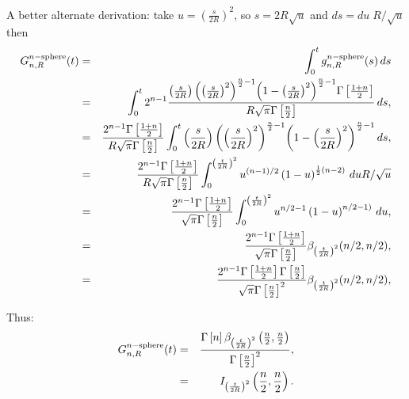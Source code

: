      
A better alternate derivation: take $u={\left(\frac{s}{2R}\right)}^2$, so $s = 2R \sqrt{u}$ and $ds = du\; R / \sqrt{u}$ then
\begin{eqnarray}
G^{n-{\rm sphere}}_{n,R}(t)
    & = & \int_0^t g^{n-{\rm sphere}}_{n,R}(s) \, ds \nonumber \\
    & = & \int_0^t  2^{n-1} \frac{\left( \frac{s}{2R}\right) {\left({\left( \frac{s}{2R}\right)}^{2}\right)}^{\frac{n}{2} -1}
             {\left(1 - {\left( \frac{s}{2R}\right)}^{2}  \right)}^{\frac{n}{2} -1}
             \Gamma\left[\frac{1+n}{2}\right]}{R\sqrt{\pi }
             \Gamma\left[\frac{n}{2}\right]} 
             \, ds, \nonumber \\    
    & = & \frac{ 2^{n- 1} \Gamma\left[\frac{1+n}{2}\right]}{R\sqrt{\pi}\Gamma\left[\frac{n}{2}\right]}
           \int_0^t \left( \frac{s}{2R}\right) {\left({\left( \frac{s}{2R}\right)}^{2}\right)}^{\frac{n}{2} -1}
             {\left(1 - {\left( \frac{s}{2R}\right)}^{2}  \right)}^{\frac{n}{2} -1}
             \, ds, \nonumber \\    
    & = & \frac{ 2^{n-1} \Gamma\left[\frac{1+n}{2}\right]}{R\sqrt{\pi}\Gamma\left[\frac{n}{2}\right]}
           \int_0^{ {\left(\frac{t}{2R}\right)}^{2} } u^{(n-1)/2}  \left(1 - u\right)^{\frac{1}{2} (n-2)}
             \, du R / \sqrt{u}  \nonumber \\    
    & = & \frac{ 2^{n-1} \Gamma\left[\frac{1+n}{2}\right]}{\sqrt{\pi}\Gamma\left[\frac{n}{2}\right]}
           \int_0^{{\left(\frac{t}{2R}\right)}^{2}} u^{n/2-1}  \left(1 - u\right)^{n/2-1)}
             \, du,  \nonumber \\    
    & = & \frac{ 2^{n-1} \Gamma\left[\frac{1+n}{2}\right]}{\sqrt{\pi}\Gamma\left[\frac{n}{2}\right]}
               \beta_{{\left(\frac{t}{2R}\right)}^{2}}(n/2, n/2),  \nonumber \\    
    & = & \frac{ 2^{n-1} \Gamma\left[\frac{1+n}{2}\right] \Gamma\left[\frac{n}{2}\right] }{\sqrt{\pi}\Gamma\left[\frac{n}{2}\right]^2}
               \beta_{{\left(\frac{t}{2R}\right)}^{2}}(n/2, n/2),  \nonumber \\ 
\end{eqnarray}




Thus:
\begin{eqnarray}
G^{n-{\rm sphere}}_{n,R}(t)
    & = &\frac{\Gamma \left[n \right] {\beta}_{{\left(\frac{t}{2 R}\right)}^{2}}\left( \frac{n}{2},\frac{n}{2}\right)}
     {\Gamma\left[\frac{n}{2}\right]^{2}},  \nonumber \\   
     & = &  {I}_{{\left(\frac{t}{2 R}\right)}^{2}}\left( \frac{n}{2},\frac{n}{2}\right).
\end{eqnarray}




